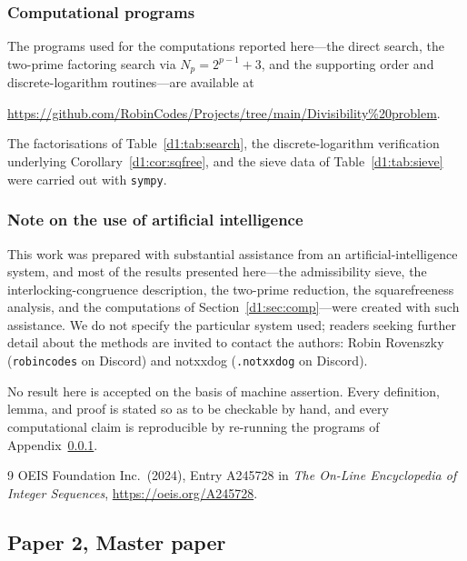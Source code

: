 \documentclass[a4paper]{article}
\theoremstyle{plain}
\theoremstyle{definition}
\theoremstyle{remark}
\begin{document}
\subsubsection{Computational programs}\label{d1:app:programs}
The programs used for the computations reported here---the direct search, the two-prime
factoring search via $N_{p}=2^{p-1}+3$, and the supporting order and discrete-logarithm
routines---are available at
\begin{center}
\url{https://github.com/RobinCodes/Projects/tree/main/Divisibility%20problem}.
\end{center}
The factorisations of Table~\ref{d1:tab:search}, the discrete-logarithm verification underlying
Corollary~\ref{d1:cor:sqfree}, and the sieve data of Table~\ref{d1:tab:sieve} were carried out with
\texttt{sympy}.

\subsubsection{Note on the use of artificial intelligence}\label{d1:app:ai}
This work was prepared with substantial assistance from an artificial-intelligence system, and
most of the results presented here---the admissibility sieve, the interlocking-congruence
description, the two-prime reduction, the squarefreeness analysis, and the computations of
Section~\ref{d1:sec:comp}---were created with such assistance. We do not specify the particular
system used; readers seeking further detail about the methods are invited to contact the authors:
Robin Rovenszky (\texttt{robincodes} on Discord) and notxxdog (\texttt{.notxxdog} on Discord).

No result here is accepted on the basis of machine assertion. Every definition, lemma, and proof
is stated so as to be checkable by hand, and every computational claim is reproducible by
re-running the programs of Appendix~\ref{d1:app:programs}.

\begin{thebibliography}{9}
 OEIS Foundation Inc.\ (2024), Entry A245728 in \emph{The On-Line Encyclopedia of
Integer Sequences}, \url{https://oeis.org/A245728}.
\end{thebibliography}


\subsection{Paper 2, Master paper}
\end{document}
